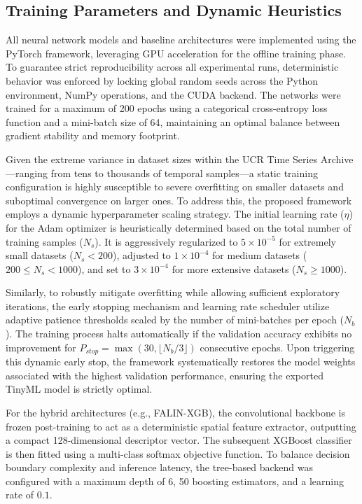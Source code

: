\documentclass[10pt,conference]{IEEEtran}
\begin{document}
\subsection{Training Parameters and Dynamic Heuristics}
\label{subsec:training}

All neural network models and baseline architectures were implemented using the PyTorch framework, leveraging GPU acceleration for the offline training phase. To guarantee strict reproducibility across all experimental runs, deterministic behavior was enforced by locking global random seeds across the Python environment, NumPy operations, and the CUDA backend. The networks were trained for a maximum of 200 epochs using a categorical cross-entropy loss function and a mini-batch size of 64, maintaining an optimal balance between gradient stability and memory footprint.

Given the extreme variance in dataset sizes within the UCR Time Series Archive—ranging from tens to thousands of temporal samples—a static training configuration is highly susceptible to severe overfitting on smaller datasets and suboptimal convergence on larger ones. To address this, the proposed framework employs a dynamic hyperparameter scaling strategy. The initial learning rate ($\eta$) for the Adam optimizer is heuristically determined based on the total number of training samples ($N_s$). It is aggressively regularized to $5 \times 10^{-5}$ for extremely small datasets ($N_s < 200$), adjusted to $1 \times 10^{-4}$ for medium datasets ($200 \le N_s < 1000$), and set to $3 \times 10^{-4}$ for more extensive datasets ($N_s \ge 1000$).

Similarly, to robustly mitigate overfitting while allowing sufficient exploratory iterations, the early stopping mechanism and learning rate scheduler utilize adaptive patience thresholds scaled by the number of mini-batches per epoch ($N_b$). The training process halts automatically if the validation accuracy exhibits no improvement for $P_{stop} = \max(30, \lfloor N_b / 3 \rfloor)$ consecutive epochs. Upon triggering this dynamic early stop, the framework systematically restores the model weights associated with the highest validation performance, ensuring the exported TinyML model is strictly optimal. 

For the hybrid architectures (e.g., FALIN-XGB), the convolutional backbone is frozen post-training to act as a deterministic spatial feature extractor, outputting a compact 128-dimensional descriptor vector. The subsequent XGBoost classifier is then fitted using a multi-class softmax objective function. To balance decision boundary complexity and inference latency, the tree-based backend was configured with a maximum depth of 6, 50 boosting estimators, and a learning rate of $0.1$.
\end{document}
